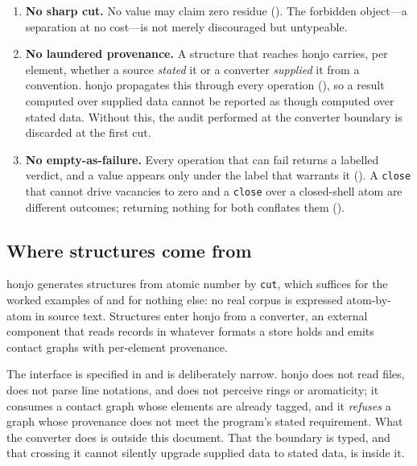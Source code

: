 \documentclass[11pt,twocolumn,a4paper]{article}
\theoremstyle{thmstyle}
\theoremstyle{definition}
\theoremstyle{remark}
\newcommand{\hj}[1]{\texttt{#1}}
\begin{document}
\begin{enumerate}[label=(P\arabic*),leftmargin=3em,itemsep=3pt]
\item \textbf{No sharp cut.} No value may claim zero residue
(). The forbidden object---a separation at no
cost---is not merely discouraged but untypeable.

\item \textbf{No laundered provenance.} A structure that reaches honjo
carries, per element, whether a source \emph{stated} it or a converter
\emph{supplied} it from a convention. honjo propagates this through every
operation (), so a result computed over supplied
data cannot be reported as though computed over stated data. Without
this, the audit performed at the converter boundary is discarded at the
first cut.

\item \textbf{No empty-as-failure.} Every operation that can fail returns
a labelled verdict, and a value appears only under the label that
warrants it (). A \hj{close} that cannot drive
vacancies to zero and a \hj{close} over a closed-shell atom are different
outcomes; returning nothing for both conflates them
().
\end{enumerate}

\subsection{Where structures come from}
\label{sec:where-from}

honjo generates structures from atomic number by \hj{cut}, which suffices
for the worked examples of  and for nothing else: no
real corpus is expressed atom-by-atom in source text. Structures enter
honjo from a converter, an external component that reads records in
whatever formats a store holds and emits contact graphs with per-element
provenance.

The interface is specified in  and is deliberately
narrow. honjo does not read files, does not parse line notations, and
does not perceive rings or aromaticity; it consumes a contact graph whose
elements are already tagged, and it \emph{refuses} a graph whose
provenance does not meet the program's stated requirement. What the
converter does is outside this document. That the boundary is typed, and
that crossing it cannot silently upgrade supplied data to stated data, is
inside it.
\end{document}
